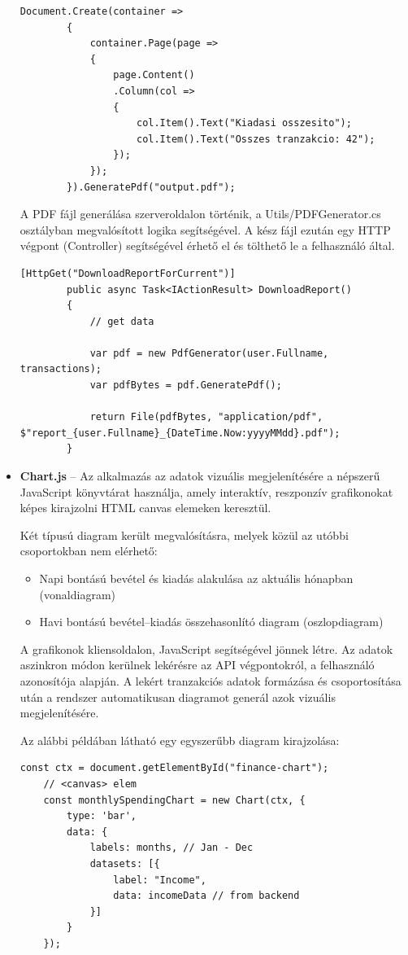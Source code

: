 \begin{itemize}
	\begin{lstlisting}[language={[Sharp]C}]
		Document.Create(container =>
		{
			container.Page(page =>
			{
				page.Content()
				.Column(col =>
				{
					col.Item().Text("Kiadasi osszesito");
					col.Item().Text("Osszes tranzakcio: 42");
				});
			});
		}).GeneratePdf("output.pdf");
	\end{lstlisting}
	
	A PDF fájl generálása szerveroldalon történik, a Utils/PDFGenerator.cs osztályban megvalósított logika segítségével. A kész fájl ezután egy HTTP végpont (Controller) segítségével érhető el és tölthető le a felhasználó által.
	
	\begin{lstlisting}[language={[Sharp]C}]
		[HttpGet("DownloadReportForCurrent")]
		public async Task<IActionResult> DownloadReport()
		{
			// get data
			
			var pdf = new PdfGenerator(user.Fullname, transactions);
			var pdfBytes = pdf.GeneratePdf();
			
			return File(pdfBytes, "application/pdf", $"report_{user.Fullname}_{DateTime.Now:yyyyMMdd}.pdf");
		}
	\end{lstlisting}
	\item \textbf{Chart.js} – Az alkalmazás az adatok vizuális megjelenítésére a népszerű JavaScript könyvtárat használja, amely interaktív, reszponzív grafikonokat képes kirajzolni HTML canvas elemeken keresztül.
	
	Két típusú diagram került megvalósításra, melyek közül az utóbbi csoportokban nem elérhető:
	\begin{itemize}
		\item Napi bontású bevétel és kiadás alakulása az aktuális hónapban (vonaldiagram)
		\item Havi bontású bevétel–kiadás összehasonlító diagram (oszlopdiagram)
	\end{itemize}
	
	A grafikonok kliensoldalon, JavaScript segítségével jönnek létre. Az adatok aszinkron módon kerülnek lekérésre az API végpontokról, a felhasználó azonosítója alapján. A lekért tranzakciós adatok formázása és csoportosítása után a rendszer automatikusan diagramot generál azok vizuális megjelenítésére.
	
	Az alábbi példában látható egy egyszerűbb diagram kirajzolása:
	
	\begin{lstlisting}[language={[Sharp]C}]
 	const ctx = document.getElementById("finance-chart");
 	// <canvas> elem
 	const monthlySpendingChart = new Chart(ctx, {
 		type: 'bar',
 		data: {
 			labels: months, // Jan - Dec
 			datasets: [{
 				label: "Income",
 				data: incomeData // from backend
 			}]
 		}
 	});
	\end{lstlisting}
\end{itemize}

